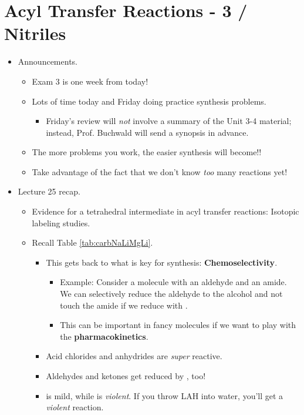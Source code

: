 \documentclass[../notes.tex]{subfiles}
\begin{document}
\section{Acyl Transfer Reactions - 3 / Nitriles}
\begin{itemize}
    \item {}Announcements.
    \begin{itemize}
        \item Exam 3 is one week from today!
        \item Lots of time today and Friday doing practice synthesis problems.
        \begin{itemize}
            \item Friday's review will \emph{not} involve a summary of the Unit 3-4 material; instead, Prof. Buchwald will send a synopsis in advance.
        \end{itemize}
        \item The more problems you work, the easier synthesis will become!!
        \item Take advantage of the fact that we don't know \emph{too} many reactions yet!
    \end{itemize}
    \item Lecture 25 recap.
    \begin{itemize}
        \item Evidence for a tetrahedral intermediate in acyl transfer reactions: Isotopic labeling studies.
        \item Recall Table \ref{tab:carbNaLiMgLi}.
        \begin{itemize}
            \item This gets back to what is key for synthesis: \textbf{Chemoselectivity}.
            \begin{itemize}
                \item Example: Consider a molecule with an aldehyde and an amide. We can selectively reduce the aldehyde to the alcohol and not touch the amide if we reduce with .
                \item This can be important in fancy molecules if we want to play with the \textbf{pharmacokinetics}.
            \end{itemize}
            \item Acid chlorides and anhydrides are \emph{super} reactive.
            \item Aldehydes and ketones get reduced by , too!
            \item {} is mild, while  is \emph{violent}. If you throw LAH into water, you'll get a \emph{violent} reaction.

\end{itemize}
\end{itemize}
\end{itemize}
\end{document}

